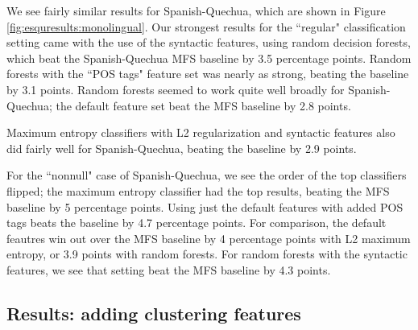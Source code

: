 We see fairly similar results for Spanish-Quechua, which are shown in Figure
\ref{fig:esquresults:monolingual}. Our strongest results for the ``regular"
classification setting came with the use of the syntactic features, using
random decision forests, which beat the Spanish-Quechua MFS baseline by 3.5
percentage points. Random forests with the ``POS tags" feature set was nearly
as strong, beating the baseline by 3.1 points. Random forests seemed to work
quite well broadly for Spanish-Quechua; the default feature set beat the
MFS baseline by 2.8 points.

Maximum entropy classifiers with L2 regularization and syntactic features also
did fairly well for Spanish-Quechua, beating the baseline by 2.9 points.

For the ``nonnull" case of Spanish-Quechua, we see the order of the top
classifiers flipped; the maximum entropy classifier had the top results,
beating the MFS baseline by 5 percentage points. Using just the default
features with added POS tags beats the baseline by 4.7 percentage points. For
comparison, the default feautres win out over the MFS baseline by 4 percentage
points with L2 maximum entropy, or 3.9 points with random forests. For random
forests with the syntactic features, we see that setting beat the MFS baseline
by 4.3 points.

\subsection{Results: adding clustering features}

